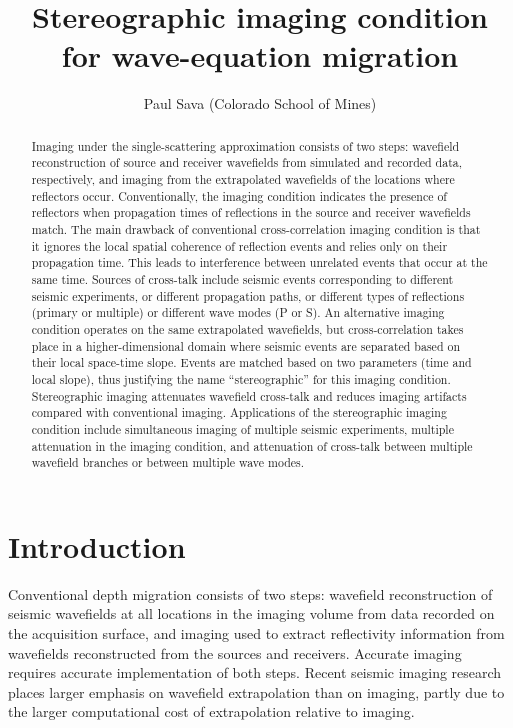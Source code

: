 \title{Stereographic imaging condition for wave-equation migration}
\author{Paul Sava (Colorado School of Mines)}





\maketitle
\begin{abstract}
Imaging under the single-scattering approximation consists of two
steps: wavefield reconstruction of source and receiver wavefields from
simulated and recorded data, respectively, and imaging from the
extrapolated wavefields of the locations where reflectors occur.
Conventionally, the imaging condition indicates the presence of
reflectors when propagation times of reflections in the source and
receiver wavefields match. The main drawback of conventional
cross-correlation imaging condition is that it ignores the local
spatial coherence of reflection events and relies only on their
propagation time. This leads to interference between unrelated events
that occur at the same time. Sources of cross-talk include seismic
events corresponding to different seismic experiments, or different
propagation paths, or different types of reflections (primary or
multiple) or different wave modes (P or S). An alternative imaging
condition operates on the same extrapolated wavefields, but
cross-correlation takes place in a higher-dimensional domain where
seismic events are separated based on their local space-time
slope. Events are matched based on two parameters (time and local
slope), thus justifying the name ``stereographic'' for this imaging
condition. Stereographic imaging attenuates wavefield cross-talk and
reduces imaging artifacts compared with conventional imaging.
Applications of the stereographic imaging condition include
simultaneous imaging of multiple seismic experiments, multiple
attenuation in the imaging condition, and attenuation of cross-talk
between multiple wavefield branches or between multiple wave modes.
\end{abstract}

\section{Introduction}
Conventional depth migration consists of two steps: wavefield
reconstruction of seismic wavefields at all locations in the imaging
volume from data recorded on the acquisition surface, and
imaging used to extract reflectivity information from
wavefields reconstructed from the sources and receivers. Accurate
imaging requires accurate implementation of both steps.  Recent
seismic imaging research places larger emphasis on wavefield
extrapolation than on imaging, partly due to the larger computational
cost of extrapolation relative to imaging.

